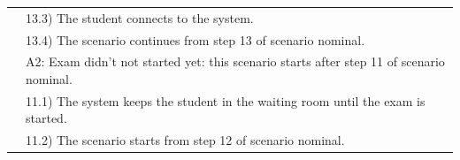\documentclass[]{uc2pfecaneva}
\begin{document}
\begin{table}[h]
\begin{tabularx}{\textwidth}{|l|X|}
            & \hspace{4mm}13.3) The student connects to the system.                                             \\
            & \hspace{4mm}13.4) The scenario continues from step 13 of scenario nominal.                        \\
            & A2: Exam didn't not started yet: this scenario starts after step 11 of scenario nominal.          \\
            & \hspace{4mm}11.1) The system keeps the student in the waiting room until the exam is started.     \\
            & \hspace{4mm}11.2) The scenario starts from step 12 of scenario nominal.                           \\ \hline
        \end{tabularx}

        \label{table:4}
    \end{table}
    \clearpage
\end{document}
